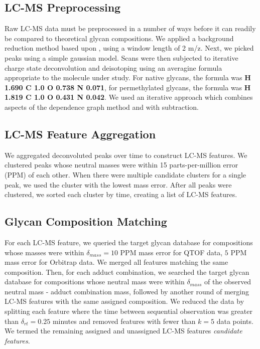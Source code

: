 \documentclass{article}
\begin{document}
\subsection{LC-MS Preprocessing}
Raw LC-MS data must be preprocessed in a number of ways before it can readily be
compared to theoretical glycan compositions. We applied a background reduction
method based upon \cite{Kaur2006}, using a window length of 2 m/z. Next, we picked
peaks using a simple gaussian model. Scans were then subjected to iterative charge
state deconvolution and deisotoping using an averagine \cite{Senko1995} formula
appropriate to the molecule under study. For native glycans, the formula was
{\bf H 1.690 C 1.0 O 0.738 N 0.071}, for permethylated glycans, the formula was
{\bf H 1.819 C 1.0 O 0.431 N 0.042}. We used an iterative approach which combines
aspects of the dependence graph method \cite{Liu2010} and with subtraction. 

\subsection{LC-MS Feature Aggregation}
We aggregated deconvoluted peaks over time to construct LC-MS features. We clustered
peaks whose neutral masses were within 15 parts-per-million error (PPM) of each other.
When there were multiple candidate clusters for a single peak, we used the cluster
with the lowest mass error. After all peaks were clustered, we sorted each cluster
by time, creating a list of LC-MS features.

\subsection{Glycan Composition Matching}
For each LC-MS feature, we queried the target glycan database for compositions whose
masses were within $\delta_{mass} = 10$ PPM mass error for QTOF data, $5$ PPM mass error
for Orbitrap data. We merged all features matching the same composition. Then, for
each adduct combination, we searched the target glycan database for compositions
whose neutral mass were within $\delta_{mass}$ of the observed neutral mass - adduct
combination mass, followed by another round of merging LC-MS features with the same
assigned composition. We reduced the data by splitting each feature where the time
between sequential observation was greater than $\delta_{rt} = 0.25$ minutes and
removed features with fewer than $k = 5$ data points. We termed the remaining assigned
and unassigned LC-MS features {\em candidate features}.
\end{document}
